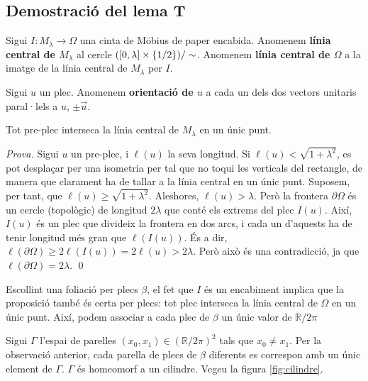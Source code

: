 \subsection{Demostració del lema T}
\begin{defi}
    Sigui $I:M_\lambda\to\Omega$ una cinta de Möbius de paper encabida. 
    Anomenem \textbf{línia central de $M_\lambda$} al cercle $([0,\lambda]\times\{1/2\})/\sim$.
    Anomenem \textbf{línia central de $\Omega$} a la imatge de la línia central de $M_\lambda$ per $I$.
\end{defi}

\begin{defi}
    Sigui $u$ un plec. Anomenem \textbf{orientació de $u$} a cada un dels dos vectors unitaris paral·lels a $u$, $\pm \vec u$.
\end{defi}

\begin{prop}
    Tot pre-plec interseca la línia central de $M_\lambda$ en un únic punt.
\end{prop}
{
    \color{green!50!black}
    \textit{Prova.}
    Sigui $u$ un pre-plec, i $\ell(u)$ la seva longitud. Si $\ell(u)<\sqrt{1+\lambda^2}$, es pot desplaçar per una isometria per tal que no toqui les verticals del rectangle, de manera que clarament ha de tallar a la línia central en un únic punt.
    Suposem, per tant, que $\ell(u)\geq\sqrt{1+\lambda^2}$. Aleshores, $\ell(u)>\lambda$. Però la frontera $\partial \Omega$ és un cercle (topològic) de longitud $2\lambda$ que conté els extrems del plec $I(u)$. Així, $I(u)$ és un plec que divideix la frontera en dos arcs, i cada un d'aquests ha de tenir longitud més gran que $\ell(I(u))$. És a dir, $\ell(\partial \Omega) \ge  2\ell(I(u)) = 2\ell(u)>2\lambda$. Però això és una contradicció, ja que $\ell(\partial \Omega) = 2\lambda$.
    \qed
}
\begin{obs}
    Escollint una foliació per plecs $\beta$, el fet que $I$ és un encabiment implica que la proposició també és certa per plecs: tot plec interseca la línia central de $\Omega$ en un únic punt. Així, podem associar a cada plec de $\beta$ un únic valor de $\mathbb R/2\pi$
\end{obs}

Sigui $\Gamma$ l'espai de parelles $(x_0,x_1)\in(\mathbb R/2\pi)^2$ tals que $x_0\neq x_1$. Per la observació anterior, cada parella de plecs de $\beta$ diferents es correspon amb un únic element de $\Gamma$. $\Gamma$ és homeomorf a un cilindre. Vegeu la figura \ref{fig:cilindre}.

